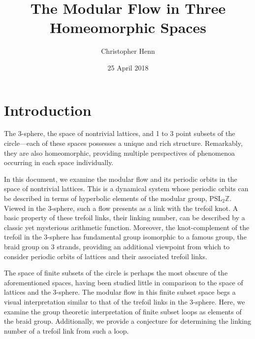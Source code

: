 \documentclass[12pt,twoside]{reedthesis}
\title{The Modular Flow in Three Homeomorphic Spaces}
\author{Christopher Henn}
\date{25 April 2018}
\theoremstyle{definition}
\newcommand{\Z}{\mathbb{Z}}
\newcommand{\PSLZ}{\mathrm{PSL}_2{\Z}}
\begin{document}
\setlength{\abovedisplayshortskip}{1em}
\setlength{\belowdisplayshortskip}{1em}
\setlength{\abovedisplayskip}{1em}
\setlength{\belowdisplayskip}{1em}

\maketitle
\frontmatter
\pagestyle{empty}


\setlength{\parskip}{0.2em}
\tableofcontents
\setlength{\parskip}{1em}


\mainmatter
\pagestyle{fancyplain}

\chapter*{Introduction}

The 3-sphere, the space of nontrivial lattices, and 1 to 3 point subsets of the circle---each of these spaces possesses a unique and rich structure.
Remarkably, they are also homeomorphic, providing multiple perspectives of phenomenoa occurring in each space individually.

In this document, we examine the modular flow and its periodic orbits in the space of nontrivial lattices.
This is a dynamical system whose periodic orbits can be described in terms of hyperbolic elements of the modular group, $\PSLZ$.
Viewed in the 3-sphere, such a flow presents as a link with the trefoil knot.
A basic property of these trefoil links, their linking number, can be described by a classic yet mysterious arithmetic function.
Moreover, the knot-complement of the trefoil in the 3-sphere has fundamental group isomorphic to a famous group, the braid group on 3 strands, providing an additional viewpoint from which to consider periodic orbits of lattices and their associated trefoil links.

The space of finite subsets of the circle is perhaps the most obscure of the aforementioned spaces, having been studied little in comparison to the space of lattices and the 3-sphere.
The modular flow in this finite subset space begs a visual interpretation similar to that of the trefoil links in the 3-sphere.
Here, we examine the group theoretic interpretation of finite subset loops as elements of the braid group.
Additionally, we provide a conjecture for determining the linking number of a trefoil link from such a loop.
\end{document}
